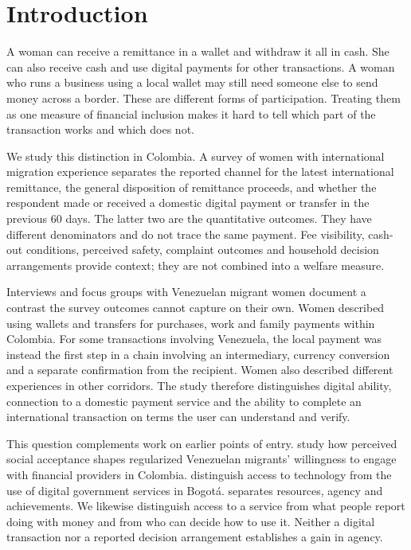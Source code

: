 \section{Introduction}
A woman can receive a remittance in a wallet and withdraw it all in cash. She can also receive cash and use digital payments for other transactions. A woman who runs a business using a local wallet may still need someone else to send money across a border. These are different forms of participation. Treating them as one measure of financial inclusion makes it hard to tell which part of the transaction works and which does not.

We study this distinction in Colombia. A survey of women with international migration experience separates the reported channel for the latest international remittance, the general disposition of remittance proceeds, and whether the respondent made or received a domestic digital payment or transfer in the previous 60 days. The latter two are the quantitative outcomes. They have different denominators and do not trace the same payment. Fee visibility, cash-out conditions, perceived safety, complaint outcomes and household decision arrangements provide context; they are not combined into a welfare measure.

Interviews and focus groups with Venezuelan migrant women document a contrast the survey outcomes cannot capture on their own. Women described using wallets and transfers for purchases, work and family payments within Colombia. For some transactions involving Venezuela, the local payment was instead the first step in a chain involving an intermediary, currency conversion and a separate confirmation from the recipient. Women also described different experiences in other corridors. The study therefore distinguishes digital ability, connection to a domestic payment service and the ability to complete an international transaction on terms the user can understand and verify.

This question complements work on earlier points of entry. \citet{barboni2025} study how perceived social acceptance shapes regularized Venezuelan migrants' willingness to engage with financial providers in Colombia. \citet{martinshields2022} distinguish access to technology from the use of digital government services in Bogotá. \citet{kabeer1999} separates resources, agency and achievements. We likewise distinguish access to a service from what people report doing with money and from who can decide how to use it. Neither a digital transaction nor a reported decision arrangement establishes a gain in agency.

